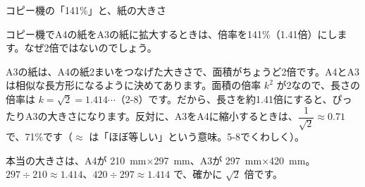 \begin{column}{コピー機の「141\%」と、紙の大きさ}
\noindent\begin{minipage}[c]{0.64\linewidth}\raggedright
コピー機でA4の紙をA3の紙に拡大するときは、倍率を141\%（1.41倍）にします。なぜ2倍ではないのでしょう。

A3の紙は、A4の紙2まいをつなげた大きさで、面積がちょうど2倍です。A4とA3は相似な長方形になるように決めてあります。面積の倍率 $k^2$ が2なので、長さの倍率は $k=\sqrt{2}=1.414\cdots$（2-8）です。だから、長さを約1.41倍にすると、ぴったりA3の大きさになります。反対に、A3をA4に縮小するときは、$\dfrac{1}{\sqrt{2}}\approx0.71$ で、71\%です（$\approx$ は「ほぼ等しい」という意味。5-8でくわしく）。

本当の大きさは、A4が \qty{210}{mm}×\qty{297}{mm}、A3が \qty{297}{mm}×\qty{420}{mm}。$297\div210\approx1.414$、$420\div297\approx1.414$ で、確かに $\sqrt{2}$ 倍です。
\end{minipage}\hfill
\begin{minipage}[c]{0.32\linewidth}\centering
{}
\end{minipage}
\end{column}

